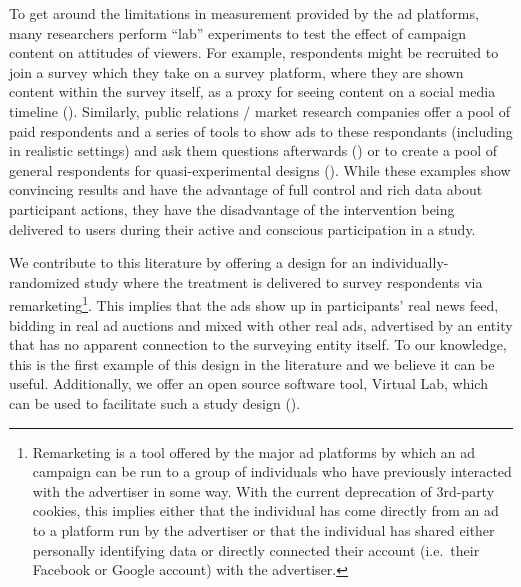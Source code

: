\documentclass[a4paper,12pt]{article}
\begin{document}
To get around the limitations in measurement provided by the ad platforms, many researchers perform ``lab'' experiments to test the effect of campaign content on attitudes of viewers. For example, respondents might be recruited to join a survey which they take on a survey platform, where they are shown content within the survey itself, as a proxy for seeing content on a social media timeline (\cite{Henry2020,Donati2020}). Similarly, public relations / market research companies offer a pool of paid respondents and a series of tools to show ads to these respondants (including in realistic settings) and ask them questions afterwards (\cite{Evans2021}) or to create a pool of general respondents for quasi-experimental designs (\cite{Sampogna2017}). While these examples show convincing results and have the advantage of full control and rich data about participant actions, they have the disadvantage of the intervention being delivered to users during their active and conscious participation in a study.

We contribute to this literature by offering a design for an individually-randomized study where the treatment is delivered to survey respondents via remarketing\footnote{Remarketing is a tool offered by the major ad platforms by which an ad campaign can be run to a group of individuals who have previously interacted with the advertiser in some way. With the current deprecation of 3rd-party cookies, this implies either that the individual has come directly from an ad to a platform run by the advertiser or that the individual has shared either personally identifying data or directly connected their account (i.e.\ their Facebook or Google account) with the advertiser.}. This implies that the ads show up in participants' real news feed, bidding in real ad auctions and mixed with other real ads, advertised by an entity that has no apparent connection to the surveying entity itself. To our knowledge, this is the first example of this design in the literature and we believe it can be useful. Additionally, we offer an open source software tool, Virtual Lab, which can be used to facilitate such a study design (\cite{Rao2020}).



\end{document}
